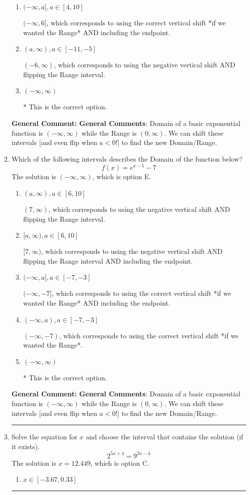 \documentclass{extbook}[14pt]
\newcommand{\litem}[1]{\item #1

\rule{\textwidth}{0.4pt}}
\begin{document}
\begin{enumerate}
{\begin{enumerate}[label=\Alph*.]
$[-6, \infty)$, which corresponds to using the negative vertical shift AND flipping the Range interval AND including the endpoint.
\item \( (-\infty, a], a \in [4, 10] \)

$(-\infty, 6]$, which corresponds to using the correct vertical shift *if we wanted the Range* AND including the endpoint.
\item \( (a, \infty), a \in [-11, -5] \)

$(-6, \infty)$, which corresponds to using the negative vertical shift AND flipping the Range interval.
\item \( (-\infty, \infty) \)

* This is the correct option.
\end{enumerate}

\textbf{General Comment:} \textbf{General Comments}: Domain of a basic exponential function is $(-\infty, \infty)$ while the Range is $(0, \infty)$. We can shift these intervals [and even flip when $a<0$!] to find the new Domain/Range.
}
\litem{
Which of the following intervals describes the Domain of the function below?
\[ f(x) = e^{x-5}-7 \]The solution is \( (-\infty, \infty) \), which is option E.\begin{enumerate}[label=\Alph*.]
\item \( (a, \infty), a \in [6, 10] \)

$(7, \infty)$, which corresponds to using the negative vertical shift AND flipping the Range interval.
\item \( [a, \infty), a \in [6, 10] \)

$[7, \infty)$, which corresponds to using the negative vertical shift AND flipping the Range interval AND including the endpoint.
\item \( (-\infty, a], a \in [-7, -3] \)

$(-\infty, -7]$, which corresponds to using the correct vertical shift *if we wanted the Range* AND including the endpoint.
\item \( (-\infty, a), a \in [-7, -3] \)

$(-\infty, -7)$, which corresponds to using the correct vertical shift *if we wanted the Range*.
\item \( (-\infty, \infty) \)

* This is the correct option.
\end{enumerate}

\textbf{General Comment:} \textbf{General Comments}: Domain of a basic exponential function is $(-\infty, \infty)$ while the Range is $(0, \infty)$. We can shift these intervals [and even flip when $a<0$!] to find the new Domain/Range.
}
\litem{
Solve the equation for $x$ and choose the interval that contains the solution (if it exists).
\[ 2^{5x+4} = 9^{2x-4} \]The solution is \( x = 12.449 \), which is option C.\begin{enumerate}[label=\Alph*.]
\item \( x \in [-3.67, 0.33] \)


\end{enumerate}}
\end{enumerate}
\end{document}
